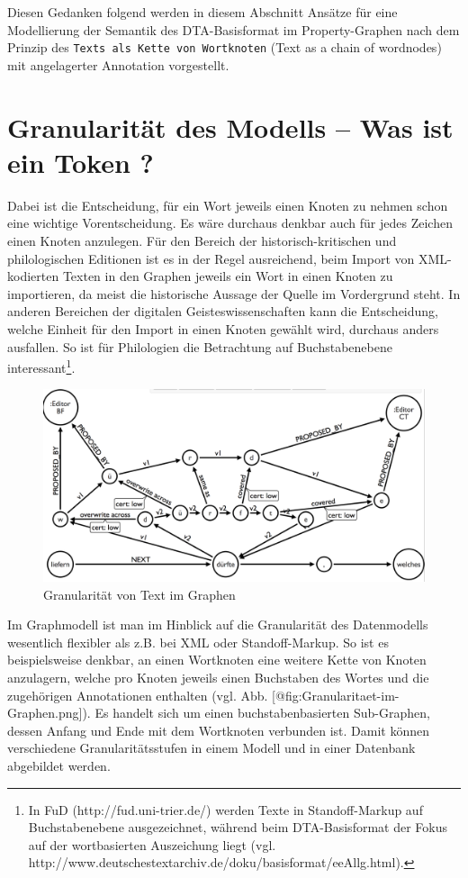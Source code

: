 \documentclass[ngerman,]{scrreprt}
\begin{document}
Diesen Gedanken folgend werden in diesem Abschnitt Ansätze für eine Modellierung der Semantik des DTA-Basisformat im Property-Graphen nach dem Prinzip des \texttt{Texts\ als\ Kette\ von\ Wortknoten} (Text as a chain of wordnodes) mit angelagerter Annotation vorgestellt.

\section{Granularität des Modells -- Was ist ein Token ?}\label{granularituxe4t-des-modells-was-ist-ein-token}

Dabei ist die Entscheidung, für ein Wort jeweils einen Knoten zu nehmen schon eine wichtige Vorentscheidung. Es wäre durchaus denkbar auch für jedes Zeichen einen Knoten anzulegen. Für den Bereich der historisch-kritischen und philologischen Editionen ist es in der Regel ausreichend, beim Import von XML-kodierten Texten in den Graphen jeweils ein Wort in einen Knoten zu importieren, da meist die historische Aussage der Quelle im Vordergrund steht. In anderen Bereichen der digitalen Geisteswissenschaften kann die Entscheidung, welche Einheit für den Import in einen Knoten gewählt wird, durchaus anders ausfallen. So ist für Philologien die Betrachtung auf Buchstabenebene interessant\footnote{In FuD (http://fud.uni-trier.de/) werden Texte in Standoff-Markup auf Buchstabenebene ausgezeichnet, während beim DTA-Basisformat der Fokus auf der wortbasierten Auszeichung liegt (vgl. http://www.deutschestextarchiv.de/doku/basisformat/eeAllg.html).}.

\begin{figure}
\centering
\includegraphics{Bilder/Granularitaet-im-Graphen.png}
\caption{Granularität von Text im Graphen}\label{fig:Granularitaet-im-Graphen.png}
\end{figure}

Im Graphmodell ist man im Hinblick auf die Granularität des Datenmodells wesentlich flexibler als z.B. bei XML oder Standoff-Markup. So ist es beispielsweise denkbar, an einen Wortknoten eine weitere Kette von Knoten anzulagern, welche pro Knoten jeweils einen Buchstaben des Wortes und die zugehörigen Annotationen enthalten (vgl. Abb. {[}@fig:Granularitaet-im-Graphen.png{]}). Es handelt sich um einen buchstabenbasierten Sub-Graphen, dessen Anfang und Ende mit dem Wortknoten verbunden ist. Damit können verschiedene Granularitätsstufen in einem Modell und in einer Datenbank abgebildet werden.
\end{document}
